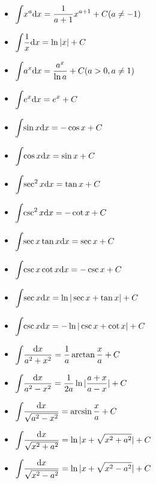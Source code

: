 \begin{multicols}{2}
    \begin{itemize}
    \item $ \displaystyle\int_{}\hspace{.2em} x^{a}\mathrm{d}x=\frac{1}{a+1}x^{a+1}+C(a\neq -1) $
    \item $ \displaystyle\int_{}\hspace{.2em} \frac{1}{x}\mathrm{d}x=\ln |x|+C $
    \item $ \displaystyle\int_{}\hspace{.2em} a^{x}\mathrm{d}x=\frac{a^{x}}{\ln a}+C(a>0, a\neq 1) $
    \item $ \displaystyle\int_{}\hspace{.2em}e^{x}\mathrm{d}x=e^{x}+C $
    \item $ \displaystyle\int_{}\hspace{.2em}\sin x \mathrm{d}x=-\cos x+C $
    \item $ \displaystyle\int_{}\hspace{.2em}\cos x \mathrm{d}x=\sin x+C $
    \item $ \displaystyle\int_{}\hspace{.2em}\sec^{2}x \mathrm{d}x=\tan x+C $
    \item $ \displaystyle\int_{}\hspace{.2em}\csc^{2}x \mathrm{d}x=-\cot x+C $
    \item $ \displaystyle\int_{}\hspace{.2em}\sec x\tan x \mathrm{d}x=\sec x+C $
    \item $ \displaystyle\int_{}\hspace{.2em}\csc x\cot x \mathrm{d}x=-\csc x+C $
    \item $ \displaystyle\int_{}\hspace{.2em}\sec x \mathrm{d}x=\ln |\sec x+\tan x|+C $
    \item $ \displaystyle\int_{}\hspace{.2em}\csc x \mathrm{d}x=-\ln|\csc x+\cot x|+C $
    \item $ \displaystyle\int_{}\hspace{.2em}\frac{\mathrm{d}x}{a^{2}+x^{2}}=\frac{1}{a}\arctan \frac{x}{a}+C $
    \item $ \displaystyle\int_{}\hspace{.2em}\frac{\mathrm{d}x}{a^{2}-x^{2}}=\frac{1}{2a}\ln |\frac{a+x}{a-x}|+C $
    \item $ \displaystyle\int_{}\hspace{.2em}\frac{\mathrm{d}x}{\sqrt{a^{2}-x^{2}}}=\arcsin \frac{x}{a}+C $
    \item $ \displaystyle\int_{}\hspace{.2em}\frac{\mathrm{d}x}{\sqrt{x^{2}+a^{2}}}=\ln|x+\sqrt{x^{2}+a^{2}}|+C $
    \item $ \displaystyle\int_{}\hspace{.2em}\frac{\mathrm{d}x}{\sqrt{x^{2}-a^{2}}}=\ln|x+\sqrt{x^{2}-a^{2}}|+C $
    \end{itemize}
\end{multicols}


